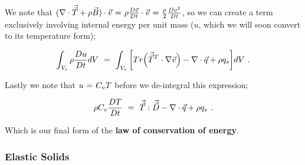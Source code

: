 \documentclass{article}
\begin{document}
We note that \begin{math} ( \nabla \cdot \vec{\vec{T}} + \rho \vec{B} ) \cdot \vec{v} \hspace{0.025cm} = \hspace{0.025cm} \rho \frac{D \vec{v}}{D t} \cdot \vec{v} \hspace{0.025cm} = \hspace{0.025cm} \frac{\rho}{2} \frac{D v^2}{D t} \end{math}, so we can create a term exclusively involving internal energy per unit mass (\begin{math} u \end{math}, which we will soon convert to its temperature form); 

\begin{equation} \label{eq:1}
\int_{V_c} \rho \frac{D u}{D t} dV \hspace{0.125cm} = \hspace{0.125cm} \int_{V_c} \bigg[ Tr \Big( \vec{\vec{T}}^T \cdot \nabla{\vec{v}} \Big) - \nabla \cdot \vec{q} + \rho q_s \bigg] dV  \hspace{0.125cm}  . 
\end{equation}

Lastly we note that \begin{math} u \hspace{0.025cm} = \hspace{0.025cm} C_v T \end{math} before we de-integral this expression;

\begin{equation} \label{eq:1}
 \rho C_v \frac{D T}{D t}\hspace{0.125cm} = \hspace{0.125cm} \vec{\vec{T}} : \vec{\vec{D}} - \nabla \cdot \vec{q} + \rho q_s \hspace{0.125cm}  . 
\end{equation}

Which is our final form of the \textbf{law of conservation of energy}. 

\vspace{5cm}



\subsubsection{Elastic Solids}
\end{document}
